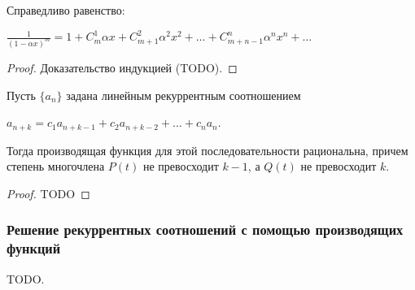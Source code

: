 \begin{lemma}
    Справедливо равенство:

    $\displaystyle\frac{1}{(1 - \alpha x)^m} = 1 + C_m^1 \alpha x + C_{m + 1}^2 \alpha^2 x^2 + \dots + C_{m + n - 1}^n \alpha^n x^n + \dots$

    \begin{proof}
        Доказательство индукцией (TODO).
    \end{proof}
\end{lemma}

\begin{theorem}
    Пусть $\{a_n\}$ задана линейным рекуррентным соотношением 

    $a_{n + k} = c_1 a_{n + k - 1} + c_2 a_{n + k - 2} + \dots + c_n a_n$.

    Тогда производящая функция для этой последовательности рациональна, причем
    степень многочлена $P(t)$ не превосходит $k - 1$, а $Q(t)$ не превосходит
    $k$. 

    \begin{proof}
        TODO
    \end{proof}
\end{theorem}

\subsubsection{Решение рекуррентных соотношений с помощью производящих функций}
TODO.







